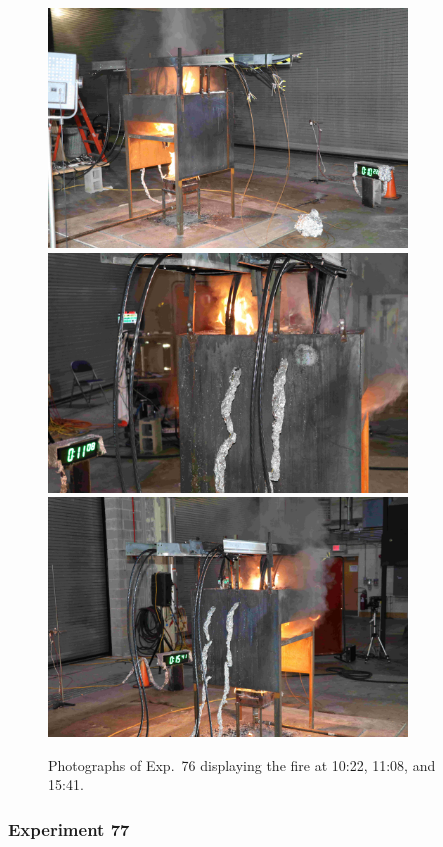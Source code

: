 \begin{figure}[p]
\centering
\includegraphics[height=2.50in]{../FIGURES/Test_76_Photo_1} \\ \vspace{0.1in}
\includegraphics[height=2.50in]{../FIGURES/Test_76_Photo_2} \\ \vspace{0.1in}
\includegraphics[height=2.50in]{../FIGURES/Test_76_Photo_3}
\caption[Photographs of Exp.~76]{Photographs of Exp.~76 displaying the fire at 10:22, 11:08, and 15:41.}
\label{fig:Test_76_photos}
\end{figure}


\clearpage

\subsubsection{Experiment 77}

